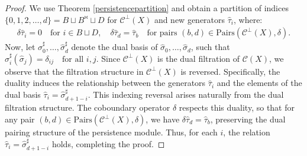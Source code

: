 \begin{proof}
We use Theorem \ref{persistencepartition} and obtain a partition of indices \( \{0, 1, 2, \ldots, d\} = B \sqcup B^{\Join} \sqcup D \) for \( \mathcal{C}^\perp(X) \) and new generators \( \hat{\tau}_i \), where:
\begin{align}
\delta \hat{\tau}_i = 0 \quad \text{for } i \in B \sqcup D, \quad \delta \hat{\tau}_d = \hat{\tau}_b \quad \text{for pairs } (b,d) \in \text{Pairs}(\mathcal{C}^\perp(X), \delta).
\end{align}
Now, let \( \hat{\sigma}_0^\sharp, \ldots, \hat{\sigma}_d^\sharp \) denote the dual basis of \( \hat{\sigma}_0, \ldots, \hat{\sigma}_d \), such that $\hat{\sigma}_i^\sharp(\hat{\sigma}_j) = \delta_{ij} \quad \text{for all } i,j$. Since \( \mathcal{C}^\perp(X) \) is the dual filtration of \( \mathcal{C}(X) \), we observe that the filtration structure in \( \mathcal{C}^\perp(X) \) is reversed. Specifically, the duality induces the relationship between the generators \( \hat{\tau}_i \) and the elements of the dual basis $\hat{\tau}_i = \hat{\sigma}_{d+1-i}^\sharp$. This indexing reversal arises naturally from the dual filtration structure. The coboundary operator \( \delta \) respects this duality, so that for any pair \( (b,d) \in \text{Pairs}(\mathcal{C}^\perp(X), \delta) \), we have $\delta \hat{\tau}_d = \hat{\tau}_b$, preserving the dual pairing structure of the persistence module. Thus, for each \( i \), the relation \( \hat{\tau}_i = \hat{\sigma}_{d+1-i}^\sharp \) holds, completing the proof.
\end{proof}